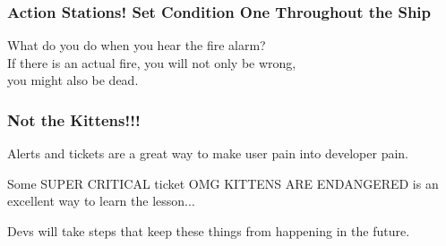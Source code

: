 \begin{frame}
\frametitle{Action Stations! Set Condition One Throughout the Ship}

\large
\begin{changemargin}{1cm}
What do you do when you hear the fire alarm?\\[1em]




If there is an actual fire, you will not only be wrong, \\
you might also be dead.
\end{changemargin}
\end{frame}



\begin{frame}
\frametitle{Not the Kittens!!!}

\large
\begin{changemargin}{1cm}
Alerts and tickets are a great way to make user pain into developer pain.

Some SUPER CRITICAL ticket OMG KITTENS ARE ENDANGERED is an excellent way to learn the lesson... 

Devs will take steps that keep these things from happening in the future.
\end{changemargin}
\end{frame}






